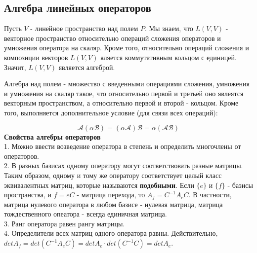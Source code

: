 \subsection{Алгебра линейных операторов}
Пусть $V$ - линейное пространство над полем $P$. Мы знаем, что $L(V,V)$ -
векторное пространство относительно операций сложения операторов и умножения
оператора на скаляр. Кроме того, относительно операций сложения и композиции 
векторов $L(V,V)$ яляется коммутативным кольцом с единицей. Значит, $L(V,V)$ 
является алгеброй. 
\begin{defin}
Алгебра над полем - множество с введенными операциями сложения, умножения и
умножения на скаляр такое, что относительно первой и третьей оно явлеятся 
векторным пространством, а относительно первой и второй - кольцом. Кроме того,
выполняется дополнительное условие (для связи всех операций):
\end{defin}
$$\mathcal A(\alpha\mathcal B)=(\alpha\mathcal A)\mathcal B=\alpha
(\mathcal A\mathcal B)$$
\textbf{Свойства алгебры операторов}\\
1. Можно ввести возведение оператора в степень и определить многочлены от 
операторов.\\
2. В разных базисах одному оператору могут соответствовать разные матрицы. 
Таким образом, одному и тому же оператору соответствует целый класс 
эквивалентных матриц, которые называются \textbf{подобными}. Если $\{e\}$ и
$\{f\}$ - базисы пространства, и $f=eC$ - матрица перехода, то $A_f=C^{-1}A_eC$.
В частности, матрица нулевого оператора в любом базисе - нулевая матрица,
матрица тождественного опеатора - всегда единичная матрица.\\
3. Ранг оператора равен рангу матрицы.\\
4. Определители всех матриц одного оператора равны. Действительно,
$detA_f=det(C^{-1}A_eC)=detA_e\cdot det(C^{-1}C)=detA_e$.


